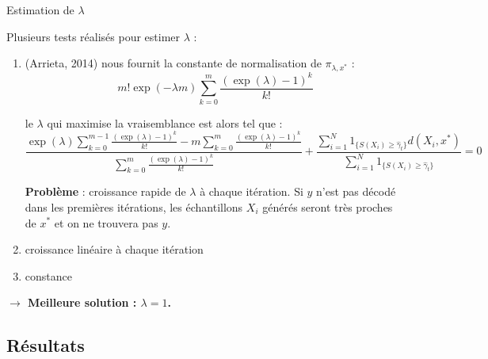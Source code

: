 \documentclass[10pt,xcolor=table,color={dvipsnames,usenames},ignorenonframetext,usepdftitle=false,french]{beamer}
\begin{document}
\begin{frame}{Estimation de \(\lambda\)}
\protect\hypertarget{estimation-de-lambda}{}

Plusieurs tests réalisés pour estimer \(\lambda\) :

\begin{enumerate}
\item (Arrieta, 2014) nous fournit la constante de normalisation de $\pi_{\lambda,x^*}$ :
$$
m!\exp(-\lambda m)\sum_{k=0}^{m}\frac{(\exp(\lambda)-1)^{k}}{k!}
$$

le $\lambda$ qui maximise la vraisemblance est alors tel que :
\footnotesize
$$
\frac{
\exp(\lambda)\sum_{k=0}^{m-1}\frac{(\exp(\lambda)-1)^{k}}{k!} -
m\sum_{k=0}^{m}\frac{(\exp(\lambda)-1)^{k}}{k!}
}{
\sum_{k=0}^{m}\frac{(\exp(\lambda)-1)^{k}}{k!}
} +
\frac{\sum_{i=1}^N 1_{\{S(X_{i})\geq\hat{\gamma}_{t}\}}d(X_i,x^*)}{\sum_{i=1}^N 1_{\{S(X_{i})\geq\hat{\gamma}_{t}\}}} = 0
$$
\normalsize

\textbf{Problème} : croissance rapide de $\lambda$ à chaque itération. Si $y$ n'est pas décodé dans les premières itérations, les échantillons $X_i$ générés seront très proches de $x^*$ et on ne trouvera pas $y$.

\pause 
\item croissance linéaire à chaque itération
\item constance
\end{enumerate}

\pause

\textbf{$\longrightarrow$ Meilleure solution : $\lambda = 1$.}

\end{frame}

\hypertarget{ruxe9sultats-3}{%
\subsection{Résultats}\label{ruxe9sultats-3}}
\end{document}
